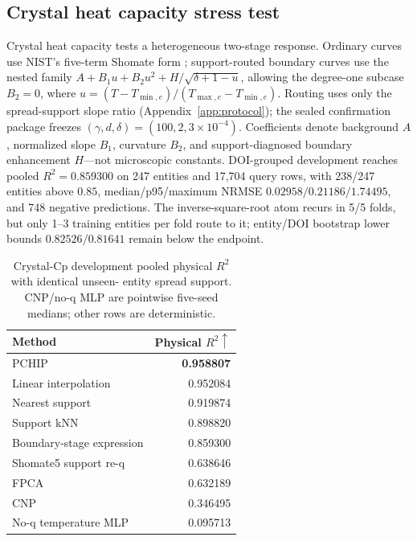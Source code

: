 \subsection{Crystal heat capacity stress test}

Crystal heat capacity tests a heterogeneous two-stage response.  Ordinary
curves use NIST's five-term Shomate form \citep{nist2025webbook}; support-routed
boundary curves use the nested family
$A+B_1u+B_2u^2+H/\sqrt{\delta+1-u}$, allowing the degree-one subcase $B_2=0$,
where $u=(T-T_{\min,e})/(T_{\max,e}-T_{\min,e})$.  Routing uses only the
spread-support slope ratio (Appendix~\ref{app:protocol}); the sealed confirmation
package freezes $(\gamma,d,\delta)=(100,2,3\times10^{-4})$.
Coefficients denote background $A$, normalized slope $B_1$, curvature $B_2$,
and support-diagnosed boundary enhancement $H$---not microscopic constants.
DOI-grouped development reaches pooled $R^2=0.859300$ on 247 entities and
17,704 query rows, with
238/247 entities above $0.85$, median/p95/maximum NRMSE
$0.02958/0.21186/1.74495$, and 748 negative predictions.  The
inverse-square-root atom recurs in 5/5 folds, but only 1--3 training entities per
fold route to it; entity/DOI bootstrap lower bounds $0.82526/0.81641$ remain
below the endpoint.

\begin{table}[t]
  \centering
  \footnotesize
  \caption{Crystal-Cp development pooled physical $R^2$ with identical unseen-
  entity spread support.  CNP/no-q MLP are pointwise five-seed medians; other
  rows are deterministic.}
  \label{tab:crystal-development}
  \begin{tabular}{@{}lr@{}}
    \toprule
    Method & Physical $R^2\uparrow$ \\
    \midrule
    PCHIP & \textbf{0.958807} \\
    Linear interpolation & 0.952084 \\
    Nearest support & 0.919874 \\
    Support kNN & 0.898820 \\
    Boundary-stage expression & 0.859300 \\
    Shomate5 support re-q & 0.638646 \\
    FPCA & 0.632189 \\
    CNP & 0.346495 \\
    No-q temperature MLP & 0.095713 \\
    \bottomrule
  \end{tabular}
\end{table}

